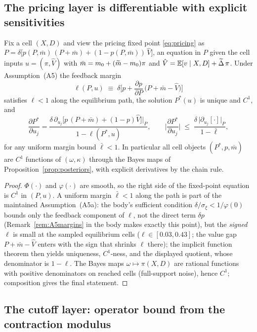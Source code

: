 \subsection{The pricing layer is differentiable with explicit sensitivities}

\begin{lemma}
\label{lem:d8-pricing}
Fix a cell $(X,D)$ and view the pricing fixed point \eqref{eq:pricing} as
$P=\delta\big[p(P,\bar m)\,(P+\bar m)+(1-p(P,\bar m))\,\hat V\big]$, an equation in $P$ given the cell inputs $u=(\pi,\hat V)$ with $\bar m=m_0+(\widetilde{m}-m_0)\pi$ and $\hat V=\mathbb{E}[v\mid X,D]+\widetilde{\Delta}\,\pi$. Under Assumption~\textup{(A5)} the feedback margin
\[
\ell(P,u)\;\equiv\;\delta\Big[p+\frac{\partial p}{\partial P}\,\big(P+\bar m-\hat V\big)\Big]
\]
satisfies $\ell<1$ along the equilibrium path, the solution $P^{*}(u)$ is unique and $C^{1}$, and
\[
\frac{\partial P^{*}}{\partial u_j}
=\frac{\delta\,\partial_{u_j}\big[p\,(P+\bar m)+(1-p)\hat V\big]\big|_{P}}{1-\ell(P^{*},u)},
\qquad
\Big|\frac{\partial P^{*}}{\partial u_j}\Big|
\;\le\;\frac{\delta\,\big|\partial_{u_j}[\cdot]\big|_{P}}{1-\bar\ell},
\]
for any uniform margin bound $\bar\ell<1$. In particular all cell objects $(P^{*},p,\bar m)$ are $C^{1}$ functions of $(\omega,\kappa)$ through the Bayes maps of Proposition~\ref{prop:posteriors}, with explicit derivatives by the chain rule.
\end{lemma}

\begin{proof}
$\Phi(\cdot)$ and $\varphi(\cdot)$ are smooth, so the right side of the fixed-point equation is $C^{1}$ in $(P,u)$. A uniform margin $\bar\ell<1$ along the path is part of the maintained Assumption~\textup{(A5a)}: the body's sufficient condition $\delta/\sigma_\xi<1/\varphi(0)$ bounds only the feedback component of $\ell$, not the direct term $\delta p$ (Remark~\ref{rem:A5margins} in the body makes exactly this point), but the \emph{signed} $\ell$ is small at the sampled equilibrium cells ($\ell\in[0.03,0.43]$; the value gap $P+\bar m-\hat V$ enters with the sign that shrinks $\ell$ there); the implicit function theorem then yields uniqueness, $C^{1}$-ness, and the displayed quotient, whose denominator is $1-\ell$. The Bayes maps $\omega\mapsto\pi(X,D)$ are rational functions with positive denominators on reached cells (full-support noise), hence $C^{1}$; composition gives the final statement.
\end{proof}

\subsection{The cutoff layer: operator bound from the contraction modulus}

